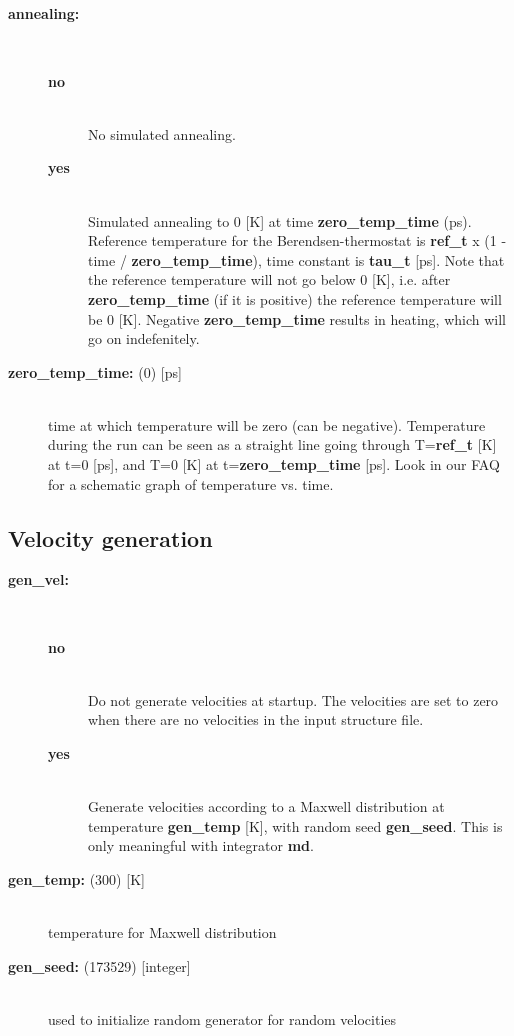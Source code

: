 \subsection{}
\begin{description}
\item[{\bf annealing:}]\mbox{}\\
\vspace{-2ex}\begin{description}
\item[{\bf no}]\mbox{}\\
No simulated annealing. 
\item[{\bf yes}]\mbox{}\\
Simulated annealing to 0 [K] at time {\bf zero\_temp\_time} (ps).
Reference temperature for the Berendsen-thermostat is
{\bf ref\_t} x (1 - time / {\bf zero\_temp\_time}),
time constant is {\bf tau\_t} [ps]. Note that the reference temperature
will not go below 0 [K], i.e. after {\bf zero\_temp\_time} (if it is positive) 
the reference temperature will be 0 [K]. Negative {\bf zero\_temp\_time} 
results in heating, which will go on indefenitely.
\end{description}
\item[{\bf zero\_temp\_time: }(0) {[ps]}]\mbox{}\\
time at which temperature will be zero (can be negative). Temperature
during the run can be seen as a straight line going through 
T={\bf ref\_t} [K] at t=0 [ps], and 
T=0 [K] at t={\bf zero\_temp\_time} [ps]. Look in our 
FAQ for a schematic 
graph of temperature vs. time.
\end{description}

\subsection{Velocity generation}
\begin{description}
\item[{\bf gen\_vel:}]\mbox{}\\
\vspace{-2ex}\begin{description}
\item[{\bf no}]\mbox{}\\
 Do not generate velocities at startup. The velocities are set to zero
when there are no velocities in the input structure file.
\item[{\bf yes}]\mbox{}\\
Generate velocities according to a Maxwell distribution at
temperature {\bf gen\_temp} [K], with random seed {\bf gen\_seed}. 
This is only meaningful with integrator {\bf md}.
\end{description}
\item[{\bf gen\_temp: }(300) {[K]}]\mbox{}\\
temperature for Maxwell distribution
\item[{\bf gen\_seed: }(173529) {[integer]}]\mbox{}\\
used to initialize random generator for random velocities
\end{description}


